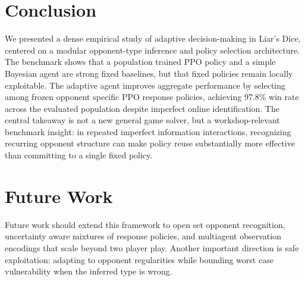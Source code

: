 \documentclass{article}
\newif\ifwithappendix
\begin{document}
\section{Conclusion}
We presented a dense empirical study of adaptive decision-making in Liar's Dice, centered on a modular opponent-type inference and policy selection architecture. The benchmark shows that a population trained PPO policy and a simple Bayesian agent are strong fixed baselines, but that fixed policies remain locally exploitable. The adaptive agent improves aggregate performance by selecting among frozen opponent specific PPO response policies, achieving 97.8\% win rate across the evaluated population despite imperfect online identification. The central takeaway is not a new general game solver, but a workshop-relevant benchmark insight: in repeated imperfect information interactions, recognizing recurring opponent structure can make policy reuse substantially more effective than committing to a single fixed policy.

\section{Future Work}
Future work should extend this framework to open set opponent recognition, uncertainty aware mixtures of response policies, and multiagent observation encodings that scale beyond two player play. Another important direction is safe exploitation: adapting to opponent regularities while bounding worst case vulnerability when the inferred type is wrong.




\ifwithappendix
\newpage
\appendix

\fi
\end{document}
